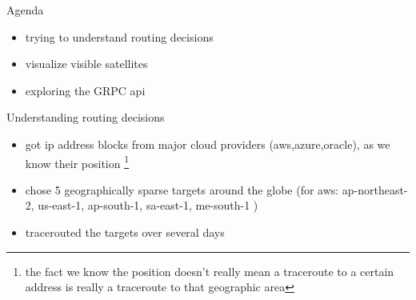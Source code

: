 \documentclass[NET,english,beameralt]{tumbeamer}
\begin{document}
\begin{frame}{Agenda}
    \begin{itemize}
        \item trying to understand routing decisions
        \item visualize visible satellites
        \item exploring the GRPC api
    \end{itemize}
\end{frame}
\begin{frame}{Understanding routing decisions}
    \begin{itemize}
        \item got ip address blocks from major cloud providers (aws,azure,oracle), as we know their position \footnote[]{the fact we know the position doesn't really mean a traceroute to a certain address is really a traceroute to that geographic area}
        \item chose 5 geographically sparse targets around the globe (for aws: ap-northeast-2, us-east-1, ap-south-1, sa-east-1, me-south-1 )
        \item tracerouted the targets over several days 
    \end{itemize}
\end{frame}
\end{document}
